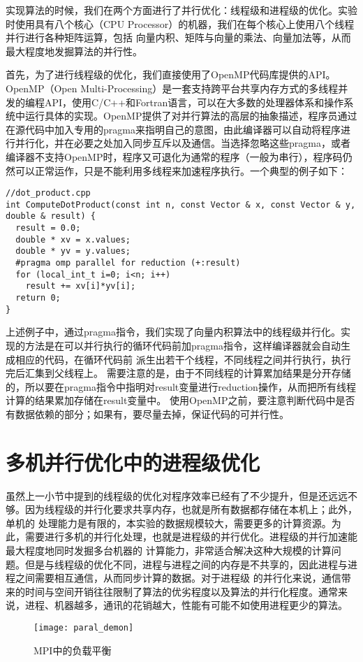 实现算法的时候，我们在两个方面进行了并行优化：线程级和进程级的优化。实验时使用具有八个核心（CPU Processor）的机器，我们在每个核心上使用八个线程并行进行各种矩阵运算，包括
向量内积、矩阵与向量的乘法、向量加法等，从而最大程度地发掘算法的并行性。

首先，为了进行线程级的优化，我们直接使用了OpenMP代码库提供的API。OpenMP（Open Multi-Processing）是一套支持跨平台共享内存方式的多线程并发的编程API，使用C/C++和Fortran语言，可以在大多数的处理器体系和操作系统中运行具体的实现。OpenMP提供了对并行算法的高层的抽象描述，程序员通过在源代码中加入专用的pragma来指明自己的意图，由此编译器可以自动将程序进行并行化，并在必要之处加入同步互斥以及通信。当选择忽略这些pragma，或者编译器不支持OpenMP时，程序又可退化为通常的程序（一般为串行），程序码仍然可以正常运作，只是不能利用多线程来加速程序执行。一个典型的例子如下：
\begin{lstlisting}
//dot_product.cpp
int ComputeDotProduct(const int n, const Vector & x, const Vector & y, double & result) {
  result = 0.0;
  double * xv = x.values;
  double * yv = y.values;
  #pragma omp parallel for reduction (+:result)
  for (local_int_t i=0; i<n; i++)
    result += xv[i]*yv[i];
  return 0;
}
\end{lstlisting}

上述例子中，通过pragma指令，我们实现了向量内积算法中的线程级并行化。实现的方法是在可以并行执行的循环代码前加pragma指令，这样编译器就会自动生成相应的代码，在循环代码前
派生出若干个线程，不同线程之间并行执行，执行完后汇集到父线程上。
需要注意的是，由于不同线程的计算累加结果是分开存储的，所以要在pragma指令中指明对result变量进行reduction操作，从而把所有线程计算的结果累加存储在result变量中。
使用OpenMP之前，要注意判断代码中是否有数据依赖的部分；如果有，要尽量去掉，保证代码的可并行性。

\section{多机并行优化中的进程级优化}

虽然上一小节中提到的线程级的优化对程序效率已经有了不少提升，但是还远远不够。因为线程级的并行化要求共享内存，也就是所有数据都存储在本机上；此外，单机的
处理能力是有限的，本实验的数据规模较大，需要更多的计算资源。为此，需要进行多机的并行化处理，也就是进程级的并行优化。进程级的并行加速能最大程度地同时发掘多台机器的
计算能力，非常适合解决这种大规模的计算问题。但是与线程级的优化不同，进程与进程之间的内存是不共享的，因此进程与进程之间需要相互通信，从而同步计算的数据。对于进程级
的并行化来说，通信带来的时间与空间开销往往限制了算法的优劣程度以及算法的并行化程度。通常来说，进程、机器越多，通讯的花销越大，性能有可能不如使用进程更少的算法。
\begin{figure}[H]
  \centering
  \texttt{[image: paral\_demon]}
  \caption{MPI中的负载平衡}
  \label{fig:figparaldemon}
\end{figure}

